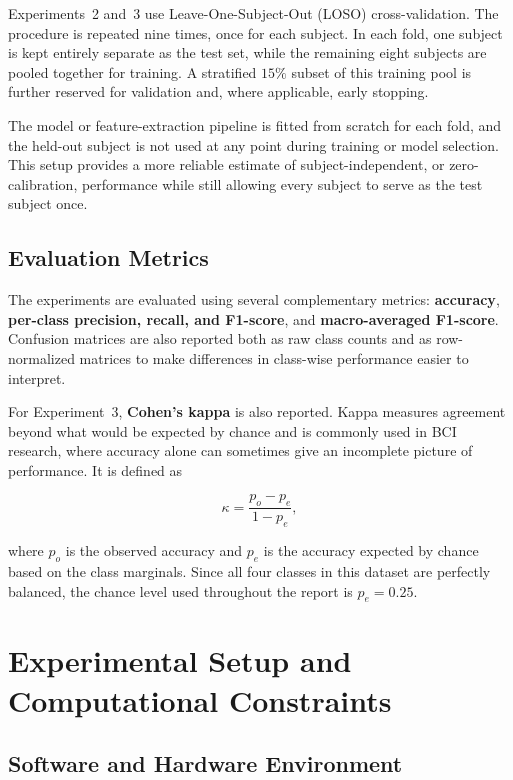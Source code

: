 \documentclass[11pt,a4paper]{article}
\begin{document}
Experiments~2 and~3 use Leave-One-Subject-Out (LOSO) cross-validation. The procedure is repeated
nine times, once for each subject. In each fold, one subject is kept entirely separate as the test
set, while the remaining eight subjects are pooled together for training. A stratified $15\%$ subset
of this training pool is further reserved for validation and, where applicable, early stopping.

The model or feature-extraction pipeline is fitted from scratch for each fold, and the held-out
subject is not used at any point during training or model selection. This setup provides a more
reliable estimate of subject-independent, or zero-calibration, performance while still allowing
every subject to serve as the test subject once.

\subsection{Evaluation Metrics}

The experiments are evaluated using several complementary metrics: \textbf{accuracy},
\textbf{per-class precision, recall, and F1-score}, and \textbf{macro-averaged F1-score}.
Confusion matrices are also reported both as raw class counts and as row-normalized matrices
to make differences in class-wise performance easier to interpret.

For Experiment~3, \textbf{Cohen's kappa} \cite{cohen1960kappa} is also reported. Kappa measures
agreement beyond what would be expected by chance and is commonly used in BCI research, where
accuracy alone can sometimes give an incomplete picture of performance. It is defined as

\[
\kappa = \frac{p_o - p_e}{1 - p_e},
\]

where $p_o$ is the observed accuracy and $p_e$ is the accuracy expected by chance based on the
class marginals. Since all four classes in this dataset are perfectly balanced, the chance level
used throughout the report is $p_e = 0.25$.
\section{Experimental Setup and Computational Constraints}
\label{sec:setup}

\subsection{Software and Hardware Environment}
\end{document}
